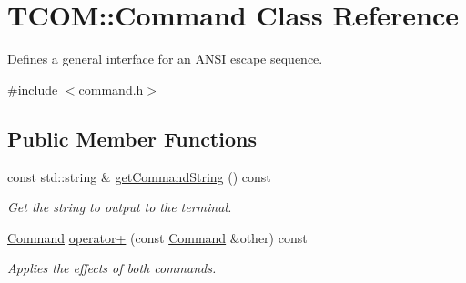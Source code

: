 \hypertarget{class_t_c_o_m_1_1_command}{\section{T\-C\-O\-M\-:\-:Command Class Reference}
\label{class_t_c_o_m_1_1_command}
}


Defines a general interface for an A\-N\-S\-I escape sequence.  




{\ttfamily \#include $<$command.\-h$>$}

\subsection*{Public Member Functions}
\begin{DoxyCompactItemize}
\item 
const std\-::string \& \hyperlink{class_t_c_o_m_1_1_command_ae4aca9ac8f9e49054efa014a51777cb8}{get\-Command\-String} () const 
\begin{DoxyCompactList}\small\item\em Get the string to output to the terminal. \end{DoxyCompactList}\item 
\hyperlink{class_t_c_o_m_1_1_command}{Command} \hyperlink{class_t_c_o_m_1_1_command_a46572b239a193204e0efa528cf600d4d}{operator+} (const \hyperlink{class_t_c_o_m_1_1_command}{Command} \&other) const 
\begin{DoxyCompactList}\small\item\em Applies the effects of both commands. \end{DoxyCompactList}\end{DoxyCompactItemize}
